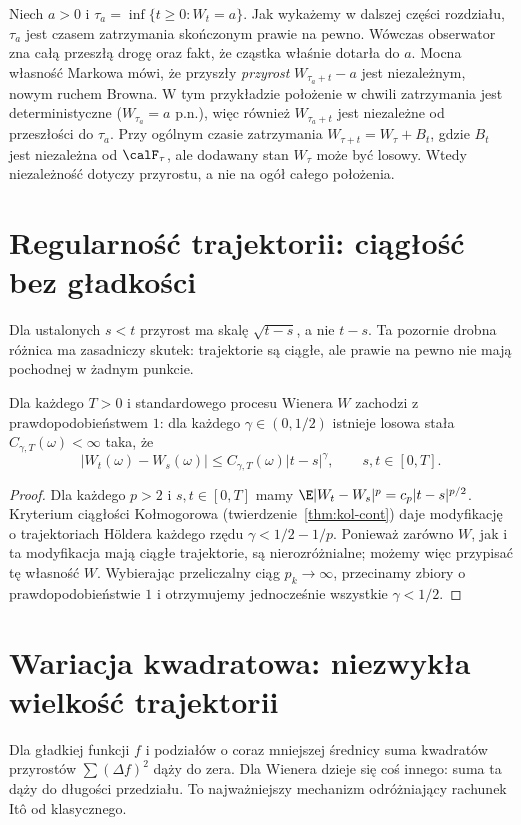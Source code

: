 \begin{przyklad}
Niech $a>0$ i $\tau_a=\inf\{t\ge0:W_t=a\}$.
Jak wykażemy w dalszej części rozdziału, $\tau_a$ jest
czasem zatrzymania skończonym prawie na pewno.
Wówczas obserwator zna
całą przeszłą drogę oraz fakt, że cząstka właśnie dotarła
do $a$. Mocna własność Markowa mówi, że przyszły \emph{przyrost}
$W_{\tau_a+t}-a$ jest niezależnym, nowym ruchem Browna.
W tym przykładzie położenie w chwili zatrzymania
jest deterministyczne ($W_{\tau_a}=a$ p.n.), więc
również $W_{\tau_a+t}$ jest niezależne od przeszłości
do $\tau_a$. Przy ogólnym czasie zatrzymania
$W_{\tau+t}=W_\tau+B_t$, gdzie $B_t$ jest niezależna
od $\calF_\tau$, ale dodawany stan $W_\tau$ może być
losowy. Wtedy niezależność dotyczy przyrostu,
a nie na ogół całego położenia.
\end{przyklad}

\section{Regularność trajektorii: ciągłość bez gładkości}
Dla ustalonych $s<t$ przyrost ma skalę $\sqrt{t-s}$,
a nie $t-s$. Ta pozornie drobna różnica ma zasadniczy
skutek: trajektorie są ciągłe, ale prawie na pewno nie
mają pochodnej w żadnym punkcie.

\begin{twierdzenie}
Dla każdego $T>0$ i standardowego procesu Wienera $W$
zachodzi z prawdopodobieństwem $1$: dla każdego
$\gamma\in(0,1/2)$ istnieje losowa stała
$C_{\gamma,T}(\omega)<\infty$ taka, że
\[
|W_t(\omega)-W_s(\omega)|
\le C_{\gamma,T}(\omega)|t-s|^\gamma,
\qquad s,t\in[0,T].
\]
\end{twierdzenie}
\begin{proof}
Dla każdego $p>2$ i $s,t\in[0,T]$ mamy
$\E|W_t-W_s|^p=c_p|t-s|^{p/2}$.
Kryterium ciągłości Kołmogorowa (twierdzenie~\ref{thm:kol-cont})
daje modyfikację
o trajektoriach H\"oldera każdego rzędu
$\gamma<1/2-1/p$. Ponieważ zarówno $W$, jak i ta
modyfikacja mają ciągłe trajektorie, są nierozróżnialne;
możemy więc przypisać tę własność $W$.
Wybierając przeliczalny ciąg $p_k\to\infty$,
przecinamy zbiory o prawdopodobieństwie $1$ i
otrzymujemy jednocześnie wszystkie $\gamma<1/2$.
\end{proof}

\section{Wariacja kwadratowa: niezwykła wielkość trajektorii}
Dla gładkiej funkcji $f$ i podziałów o coraz mniejszej
średnicy suma kwadratów przyrostów $\sum(\Delta f)^2$
dąży do zera. Dla Wienera dzieje się coś innego:
suma ta dąży do długości przedziału. To najważniejszy
mechanizm odróżniający rachunek Itô od klasycznego.

